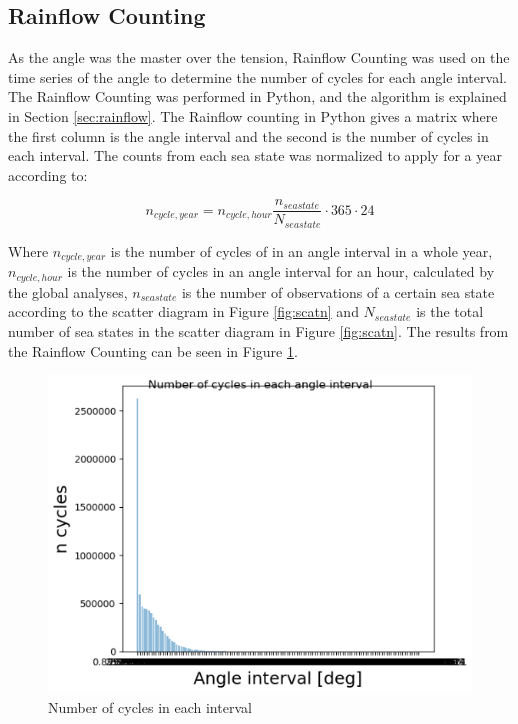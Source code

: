 \subsection{Rainflow Counting}
As the angle was the master over the tension, Rainflow Counting was used on the time series of the angle to determine the number of cycles for each angle interval. The Rainflow Counting was performed in Python, and the algorithm is explained in Section \ref{sec:rainflow}. The Rainflow counting in Python gives a matrix where the first column is the angle interval and the second is the number of cycles in each interval. The counts from each sea state was normalized to apply for a year according to:

\begin{equation}
    n_{cycle,year}=n_{cycle,hour} \frac{n_{seastate}}{N_{seastate}} \cdot 365 \cdot 24 
\end{equation}

\noindent Where $n_{cycle,year}$ is the number of cycles of in an angle interval in a whole year, $n_{cycle,hour}$ is the number of cycles in an angle interval for an hour, calculated by the global analyses, $n_{seastate}$ is the number of observations of a certain sea state according to the scatter diagram in Figure \ref{fig:scatn} and $N_{seastate}$ is the total number of sea states in the scatter diagram in Figure \ref{fig:scatn}.\newline
\newline 
\noindent The results from the Rainflow Counting can be seen in Figure \ref{fig:ncyc}.  

\begin{figure}[H]
\centering
\includegraphics[scale=0.8]{figures/ncyc}
\caption[Number of cycles in each interval]{Number of cycles in each interval}
 \label{fig:ncyc}
\end{figure}

